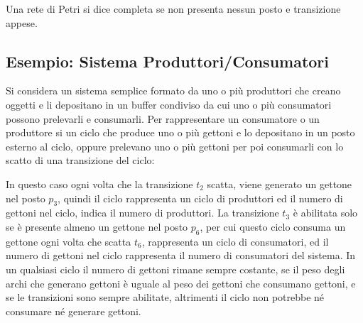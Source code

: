 \documentclass{article}
\numberwithin{equation}{subsection}
\begin{document}
Una rete di Petri si dice completa se non presenta nessun posto e transizione appese. 

\subsection{Esempio: Sistema Produttori/Consumatori}

Si considera un sistema semplice formato da uno o più produttori che creano oggetti e li depositano in un buffer condiviso da cui uno o più consumatori possono prelevarli 
e consumarli. Per rappresentare un consumatore o un produttore si un ciclo che produce uno o più gettoni e lo depositano in un posto esterno al ciclo, oppure  prelevano uno o 
più gettoni per poi consumarli con lo scatto di una transizione del ciclo:

\begin{center}
\end{center}

In questo caso ogni volta che la transizione $t_2$ scatta, viene generato un gettone nel posto $p_3$, quindi il ciclo rappresenta un ciclo di produttori ed il numero di 
gettoni nel ciclo, indica il numero di produttori. La transizione $t_3$ è abilitata solo se è presente almeno un gettone nel posto $p_6$, per cui questo ciclo 
consuma un gettone ogni volta che scatta $t_6$, rappresenta un ciclo di consumatori, ed il numero di gettoni nel ciclo rappresenta il numero di consumatori del sistema. 
In un qualsiasi ciclo il numero di gettoni rimane sempre costante, se il peso degli archi che generano gettoni è uguale al peso dei gettoni che consumano gettoni, e se le 
transizioni sono sempre abilitate, altrimenti il ciclo non potrebbe né consumare né generare gettoni. 
\end{document}
